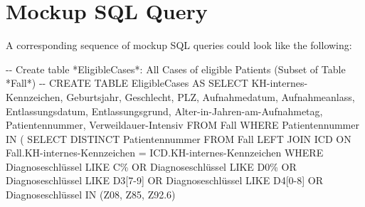 \documentclass[
  letterpaper,
  DIV=11,
  numbers=noendperiod]{scrreprt}
\newenvironment{Shaded}{\begin{snugshade}}{\end{snugshade}}
\newcommand{\CommentTok}[1]{\textcolor[rgb]{0.37,0.37,0.37}{#1}}
\newcommand{\KeywordTok}[1]{\textcolor[rgb]{0.00,0.23,0.31}{#1}}
\newcommand{\NormalTok}[1]{\textcolor[rgb]{0.00,0.23,0.31}{#1}}
\newcommand{\OperatorTok}[1]{\textcolor[rgb]{0.37,0.37,0.37}{#1}}
\newcommand{\StringTok}[1]{\textcolor[rgb]{0.13,0.47,0.30}{#1}}
\begin{document}
\hypertarget{mockup-sql-query}{%
\section{Mockup SQL Query}\label{mockup-sql-query}}

A corresponding sequence of mockup SQL queries could look like the
following:

\begin{Shaded}
\begin{Highlighting}[]

\CommentTok{{-}{-} Create table *EligibleCases*: All Cases of eligible Patients (Subset of Table *Fall*) {-}{-}}
\KeywordTok{CREATE} \KeywordTok{TABLE}\NormalTok{ EligibleCases }\KeywordTok{AS}
\KeywordTok{SELECT}\NormalTok{ KH}\OperatorTok{{-}}\NormalTok{internes}\OperatorTok{{-}}\NormalTok{Kennzeichen,}
\NormalTok{       Geburtsjahr,}
\NormalTok{       Geschlecht,}
\NormalTok{       PLZ,}
\NormalTok{       Aufnahmedatum,}
\NormalTok{       Aufnahmeanlass,}
\NormalTok{       Entlassungsdatum,}
\NormalTok{       Entlassungsgrund,}
       \KeywordTok{Alter}\OperatorTok{{-}}\KeywordTok{in}\OperatorTok{{-}}\NormalTok{Jahren}\OperatorTok{{-}}\NormalTok{am}\OperatorTok{{-}}\NormalTok{Aufnahmetag,}
\NormalTok{       Patientennummer,}
\NormalTok{       Verweildauer}\OperatorTok{{-}}\NormalTok{Intensiv}
\KeywordTok{FROM}\NormalTok{ Fall}
\KeywordTok{WHERE}\NormalTok{ Patientennummer }\KeywordTok{IN}
\NormalTok{  ( }\KeywordTok{SELECT} \KeywordTok{DISTINCT}\NormalTok{ Patientennummer}
      \KeywordTok{FROM}\NormalTok{ Fall }\KeywordTok{LEFT} \KeywordTok{JOIN}\NormalTok{ ICD }\KeywordTok{ON}\NormalTok{ Fall.KH}\OperatorTok{{-}}\NormalTok{internes}\OperatorTok{{-}}\NormalTok{Kennzeichen }\OperatorTok{=}\NormalTok{ ICD.KH}\OperatorTok{{-}}\NormalTok{internes}\OperatorTok{{-}}\NormalTok{Kennzeichen}
      \KeywordTok{WHERE}\NormalTok{ Diagnoseschlüssel }\KeywordTok{LIKE} \StringTok{\textquotesingle{}C\%\textquotesingle{}}
         \KeywordTok{OR}\NormalTok{ Diagnoseschlüssel }\KeywordTok{LIKE} \StringTok{\textquotesingle{}D0\%\textquotesingle{}}
         \KeywordTok{OR}\NormalTok{ Diagnoseschlüssel }\KeywordTok{LIKE} \StringTok{\textquotesingle{}D3[7{-}9]\textquotesingle{}}
         \KeywordTok{OR}\NormalTok{ Diagnoseschlüssel }\KeywordTok{LIKE} \StringTok{\textquotesingle{}D4[0{-}8]\textquotesingle{}}
         \KeywordTok{OR}\NormalTok{ Diagnoseschlüssel }\KeywordTok{IN}\NormalTok{ (}\StringTok{\textquotesingle{}Z08\textquotesingle{}}\NormalTok{, }\StringTok{\textquotesingle{}Z85\textquotesingle{}}\NormalTok{, }\StringTok{\textquotesingle{}Z92.6\textquotesingle{}}\NormalTok{)}

\end{Highlighting}
\end{Shaded}
\end{document}

